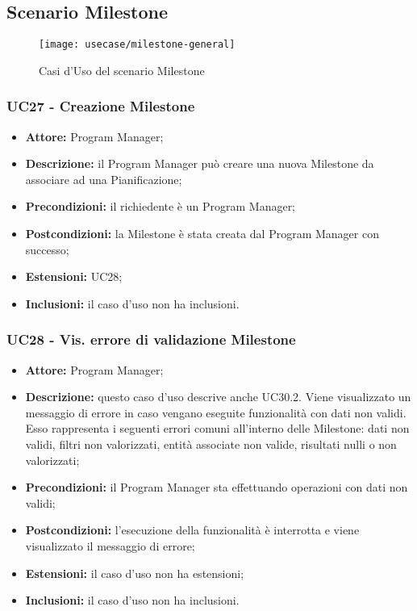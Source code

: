 \subsection{Scenario Milestone}
\begin{figure}[H] 
    \centering 
    \texttt{[image: usecase/milestone-general]} 
    \caption{Casi d'Uso del scenario Milestone}
\end{figure}

\subsubsection*{UC27 - Creazione Milestone}
\begin{itemize}[label=$\circ$]
\item \textbf{Attore:} Program Manager;
\item \textbf{Descrizione:} il Program Manager può creare una nuova Milestone da associare ad una Pianificazione;
\item \textbf{Precondizioni:} il richiedente è un Program Manager;
\item \textbf{Postcondizioni:} la Milestone è stata creata dal Program Manager con successo;
\item \textbf{Estensioni:} UC28;
\item \textbf{Inclusioni:} il caso d'uso non ha inclusioni.
\end{itemize}

\subsubsection*{UC28 - Vis. errore di validazione Milestone}
\begin{itemize}[label=$\circ$]
\item \textbf{Attore:} Program Manager;
\item \textbf{Descrizione:} questo caso d'uso descrive anche UC30.2. Viene visualizzato un messaggio di errore in caso vengano eseguite funzionalità con dati non validi. Esso rappresenta i seguenti errori comuni all'interno delle Milestone: dati non validi, filtri non valorizzati, entità associate non valide, risultati nulli o non valorizzati;
\item \textbf{Precondizioni:} il Program Manager sta effettuando operazioni con dati non validi;
\item \textbf{Postcondizioni:} l'esecuzione della funzionalità è interrotta e viene visualizzato il messaggio di errore;
\item \textbf{Estensioni:} il caso d'uso non ha estensioni;
\item \textbf{Inclusioni:} il caso d'uso non ha inclusioni.
\end{itemize}

